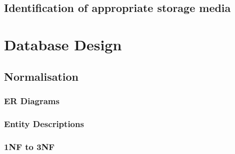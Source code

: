 \subsection{Identification of appropriate storage media}

\section{Database Design}

\subsection{Normalisation}

\subsubsection{ER Diagrams}

\subsubsection{Entity Descriptions}

\subsubsection{1NF to 3NF}

\pagebreak

